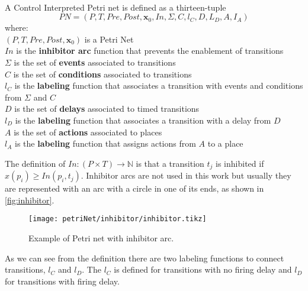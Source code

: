\begin{definition}
  \label{def:cipn}~\\
  A Control Interpreted Petri net is defined as a thirteen-tuple
  \[PN = (P,T,Pre,Post,\mathbf{x}_0,In,\Sigma,C,l_C,D,L_D,A,I_A)\]
  where: \\
  \indent $(P,T,Pre,Post,\mathbf{x}_0)$ is a Petri Net\\
  \indent $In$ is the \textbf{inhibitor arc} function that prevents the
  enablement of transitions \\
  \indent $\Sigma$ is the set of \textbf{events} associated to transitions \\
  \indent $C$ is the set of \textbf{conditions} associated to transitions \\
  \indent $l_C$ is the \textbf{labeling} function that associates a transition
  with events and conditions from $\Sigma$ and $C$\\
  \indent $D$ is the set of \textbf{delays} associated to timed transitions \\
  \indent $l_D$ is the \textbf{labeling} function that associates a transition with a delay from $D$ \\
  \indent $A$ is the set of \textbf{actions} associated to places \\
  \indent $l_A$ is the \textbf{labeling} function that assigns actions from $A$ to a place \\
\end{definition}
The definition of $In : (P \times T )\rightarrow\mathbb{N}$ is that a transition
$t_j$ is inhibited if $x(p_i)\geq In(p_i,t_j)$. Inhibitor arcs are not used in
this work but usually they are represented with an arc with a circle in one of
its ends, as shown in \autoref{fig:inhibitor}.
\begin{figure}[H]
  \centering
  \texttt{[image: petriNet/inhibitor/inhibitor.tikz]}
  \caption{Example of Petri net with inhibitor arc.}
  \label{fig:inhibitor}
\end{figure}
As we can see from the definition there are two labeling functions to connect 
transitions, $l_C$ and $l_D$. The $l_C$ is defined for transitions with no
firing delay and $l_D$ for transitions with firing delay.

